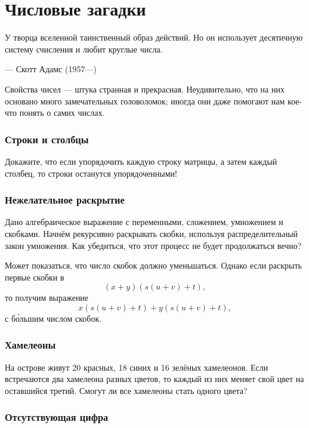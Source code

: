 \chapter{Числовые загадки}


\setlength{\epigraphwidth}{.85\textwidth}
\epigraph{У творца вселенной таинственный образ действий.
Но он использует десятичную систему счисления и любит круглые
числа.
}{--- Скотт Адамс (1957---)}


Свойства чисел --- штука странная и прекрасная.
Неудивительно, что на них основано много замечательных головоломок;
иногда они даже помогают нам кое-что понять о самих числах.

\subsection*{Строки и столбцы}

Докажите, что если упорядочить каждую строку матрицы, а затем каждый столбец, то строки останутся упорядоченными!

\subsection*{Нежелательное раскрытие}

Дано алгебраическое выражение с переменными, сложением, умножением и скобками.
Начнём рекурсивно раскрывать скобки, используя распределительный закон умножения.
Как убедиться, что этот процесс не будет продолжаться вечно?

Может показаться, что число скобок должно уменьшаться.
Однако если раскрыть первые скобки в
\[(x + y)(s(u + v) + t),\]
то получим выражение
\[x(s(u + v) + t) + y(s(u + v) + t),\]
с б\'{о}льшим числом скобок.

\subsection*{Хамелеоны}\label{Хамелеоны}

На острове живут 20 красных, 18 синих и 16 зелёных хамелеонов.
Если встречаются два хамелеона разных цветов, то каждый из них меняет свой цвет на оставшийся третий.
Смогут ли все хамелеоны стать одного цвета?

\subsection*{Отсутствующая цифра}

